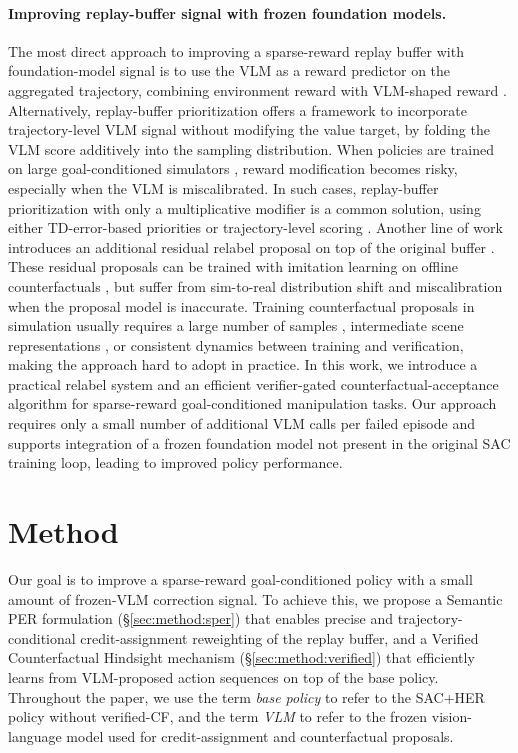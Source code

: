 \documentclass{article}
\begin{document}
\paragraph{Improving replay-buffer signal with frozen foundation
models.}
The most direct approach to improving a sparse-reward replay buffer
with foundation-model signal is to use the VLM as a reward predictor
on the aggregated trajectory, combining environment reward with
VLM-shaped reward
\citep{rocamonde2024vlmreward,lee2025kagi,patel2025iker}.
Alternatively, replay-buffer prioritization
\citep{sharony2026vlmrb} offers a framework to incorporate
trajectory-level VLM signal without modifying the value target, by
folding the VLM score additively into the sampling distribution.
When policies are trained on large goal-conditioned simulators
\citep{plappert2018multigoal,delazcano2024gymrobotics}, reward
modification becomes risky, especially when the VLM is
miscalibrated. In such cases, replay-buffer prioritization with only
a multiplicative modifier is a common solution, using either
TD-error-based priorities \citep{schaul2016per} or trajectory-level
scoring \citep{sharony2026vlmrb}. Another line of work introduces an
additional residual relabel proposal on top of the original buffer
\citep{urpi2024caiac,hu2026echo,ding2026agentHER}. These residual
proposals can be trained with imitation learning on offline
counterfactuals \citep{mesnard2021cca}, but suffer from sim-to-real
distribution shift and miscalibration when the proposal model is
inaccurate. Training counterfactual proposals in simulation usually
requires a large number of samples \citep{chuck2025hint},
intermediate scene representations \citep{lei2025gchr}, or
consistent dynamics between training and verification, making the
approach hard to adopt in practice. In this work, we introduce a
practical relabel system and an efficient verifier-gated
counterfactual-acceptance algorithm for sparse-reward
goal-conditioned manipulation tasks. Our approach requires only a
small number of additional VLM calls per failed episode and supports
integration of a frozen foundation model not present in the original
SAC training loop, leading to improved policy performance.

\section{Method}
\label{sec:method}

Our goal is to improve a sparse-reward goal-conditioned policy with
a small amount of frozen-VLM correction signal. To achieve this, we
propose a Semantic PER formulation (\S\ref{sec:method:sper}) that
enables precise and trajectory-conditional credit-assignment
reweighting of the replay buffer, and a Verified Counterfactual
Hindsight mechanism (\S\ref{sec:method:verified}) that efficiently
learns from VLM-proposed action sequences on top of the base policy.
Throughout the paper, we use the term \emph{base policy} to refer to
the SAC+HER policy without verified-CF, and the term \emph{VLM} to
refer to the frozen vision-language model used for credit-assignment
and counterfactual proposals.
\end{document}
